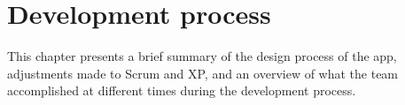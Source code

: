\chapter{Development process}
\label{sec:devProcess}
This chapter presents a brief summary of the design process of the app, adjustments made to Scrum and XP, and an overview of what the team accomplished at different times during the development process. 




